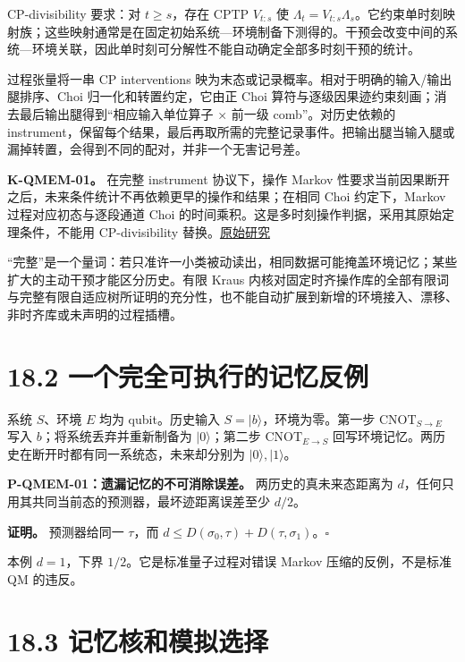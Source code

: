 \documentclass[
  11pt,
  oneside]{book}
\begin{document}
CP-divisibility 要求：对 \(t\ge s\)，存在 CPTP \(V_{t:s}\) 使
\(\Lambda_t=V_{t:s}\Lambda_s\)。它约束单时刻映射族；这些映射通常是在固定初始系统---环境制备下测得的。干预会改变中间的系统---环境关联，因此单时刻可分解性不能自动确定全部多时刻干预的统计。

过程张量将一串 CP interventions
映为末态或记录概率。相对于明确的输入/输出腿排序、Choi
归一化和转置约定，它由正 Choi
算符与逐级因果迹约束刻画；消去最后输出腿得到``相应输入单位算子 × 前一级
comb''。对历史依赖的
instrument，保留每个结果，最后再取所需的完整记录事件。把输出腿当输入腿或漏掉转置，会得到不同的配对，并非一个无害记号差。

\textbf{K-QMEM-01。} 在完整 instrument 协议下，操作 Markov
性要求当前因果断开之后，未来条件统计不再依赖更早的操作和结果；在相同
Choi 约定下，Markov 过程对应初态与逐段通道 Choi
的时间乘积。这是多时刻操作判据，采用其原始定理条件，不能用
CP-divisibility 替换。\href{https://arxiv.org/abs/1512.00589}{原始研究}

``完整''是一个量词：若只准许一小类被动读出，相同数据可能掩盖环境记忆；某些扩大的主动干预才能区分历史。有限
Kraus
内核对固定时齐操作库的全部有限词与完整有限自适应树所证明的充分性，也不能自动扩展到新增的环境接入、漂移、非时齐库或未声明的过程插槽。

\hypertarget{ux4e00ux4e2aux5b8cux5168ux53efux6267ux884cux7684ux8bb0ux5fc6ux53cdux4f8b}{%
\section{18.2
一个完全可执行的记忆反例}\label{ux4e00ux4e2aux5b8cux5168ux53efux6267ux884cux7684ux8bb0ux5fc6ux53cdux4f8b}}

系统 \(S\)、环境 \(E\) 均为 qubit。历史输入
\(S=|b\rangle\)，环境为零。第一步 \(\mathrm{CNOT}_{S\to E}\) 写入
\(b\)；将系统丢弃并重新制备为 \(|0\rangle\)；第二步
\(\mathrm{CNOT}_{E\to S}\)
回写环境记忆。两历史在断开时都有同一系统态，未来却分别为
\(|0\rangle,|1\rangle\)。

\protect\hypertarget{p-qmem-01}{}{}

\textbf{P-QMEM-01：遗漏记忆的不可消除误差。} 两历史的真未来态距离为
\(d\)，任何只用其共同当前态的预测器，最坏迹距离误差至少 \(d/2\)。

\textbf{证明。} 预测器给同一 \(\tau\)，而
\(d\le D(\sigma_0,\tau)+D(\tau,\sigma_1)\)。\(\square\)

本例 \(d=1\)，下界 \(1/2\)。它是标准量子过程对错误 Markov
压缩的反例，不是标准 QM 的违反。

\hypertarget{ux8bb0ux5fc6ux6838ux548cux6a21ux62dfux9009ux62e9}{%
\section{18.3
记忆核和模拟选择}\label{ux8bb0ux5fc6ux6838ux548cux6a21ux62dfux9009ux62e9}}
\end{document}
